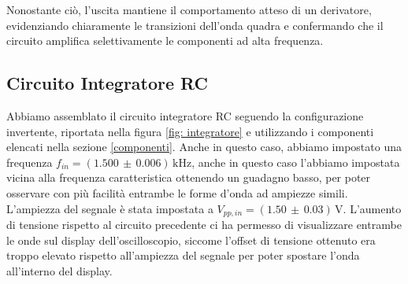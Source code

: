 \documentclass[a4paper,12pt]{article}
\begin{document}
Nonostante ciò, l’uscita mantiene il comportamento atteso di un derivatore, evidenziando chiaramente le transizioni dell’onda quadra e confermando che il circuito amplifica selettivamente le componenti ad alta frequenza.
\subsection{Circuito Integratore RC} \label{sec: int}
Abbiamo assemblato il circuito integratore RC seguendo la configurazione invertente, riportata nella figura \ref{fig: integratore} e utilizzando i componenti  elencati nella sezione \ref{componenti}. 
Anche in questo caso, abbiamo impostato una frequenza \(f_{in} = (1.500\,\pm\,0.006)\,\mathrm{kHz}\), anche in questo caso l'abbiamo impostata vicina alla frequenza caratteristica ottenendo un guadagno basso, per poter osservare con più facilità entrambe le forme d'onda ad ampiezze simili. 
L'ampiezza del segnale è stata impostata a \(V_{pp,in} = (1.50\,\pm\,0.03)\,\mathrm{V}\). L'aumento di tensione rispetto al circuito precedente ci ha permesso di visualizzare entrambe le onde sul display dell'oscilloscopio, siccome l'offset di tensione ottenuto era troppo elevato rispetto all'ampiezza del segnale per poter spostare l'onda all'interno del display.
\end{document}
